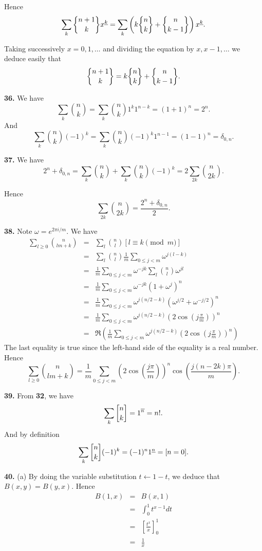 \documentclass[a4paper,12pt]{article}
\newcommand{\newpar}[1]{\bigskip \noindent \textbf{#1.}}
\newcommand{\subpar}[1]{\medskip \noindent (#1)}
\newcommand{\stirlingone}[2]{{#1 \atopwithdelims[]#2}}
\newcommand{\stirlingtwo}[2]{{#1 \atopwithdelims\{\}#2}}
\newcommand{\la}{\leftarrow}
\begin{document}
Hence
\[ \sum_k \stirlingtwo{n+1}{k} x^{\underline{k}} = \sum_k \left(k
\stirlingtwo{n}{k} + \stirlingtwo{n}{k-1}\right) x^{\underline{k}}.\]

Taking successively $x = 0, 1, \ldots$ and dividing the equation by
$x, x-1, \ldots$ we deduce easily that
\[ \stirlingtwo{n+1}{k} = k \stirlingtwo{n}{k} +
\stirlingtwo{n}{k-1}.\]

\newpar{36} We have
\[ \sum_k {n \choose k} = \sum_k {n \choose k} 1^k 1^{n-k} = (1 + 1)^n
= 2^n.\]
And
\[ \sum_k {n \choose k} (-1)^k = \sum_k {n \choose k} (-1)^k 1^{n-1} =
(1-1)^n = \delta_{0,n}.\]

\newpar{37} We have
\[ 2^n + \delta_{0,n} = \sum_k {n \choose k} + \sum_k {n \choose k}
(-1)^k = 2 \sum_{2k} {n \choose 2k}.\]

Hence
\[ \sum_{2k} {n \choose 2k} = \frac{2^n + \delta_{0,n}}{2}.\]

\newpar{38} Note $\omega = e^{2\pi i/m}$.  We have
\begin{eqnarray*}
  \sum_{l\ge 0} {n \choose lm + k} &=& \sum_l {n \choose l} [ l \equiv
    k \pmod m ] \\
  &=& \sum_l {n \choose l} \frac{1}{m} \sum_{0 \le j < m}
  \omega^{j(l-k)} \\
  &=& \frac{1}{m} \sum_{0 \le j < m} \omega^{-jk} \sum_l {n \choose l}
  \omega^{jl} \\
  &=& \frac{1}{m} \sum_{0\le j < m} \omega^{-jk} (1+\omega^j)^n \\
  &=& \frac{1}{m} \sum_{0\le j <m} \omega^{j(n/2 - k)}
  \left(\omega^{j/2} + \omega^{-j/2}\right)^n \\
  &=& \frac{1}{m} \sum_{0\le j <m} \omega^{j(n/2 - k)} \left(2
  \cos\left(j\frac{\pi}{m}\right)\right)^n \\
  &=& \Re\left(\frac{1}{m} \sum_{0\le j <m} \omega^{j(n/2 - k)} \left(2
  \cos\left(j\frac{\pi}{m}\right)\right)^n \right)
\end{eqnarray*}
The last equality is true since the left-hand side of the equality is
a real number.  Hence
\[ \sum_{l\ge 0} {n \choose lm + k} = \frac{1}{m} \sum_{0\le j < m}
\left( 2 \cos\left(\frac{j\pi}{m} \right) \right)^n
\cos\left(\frac{j(n-2k)\pi}{m}\right).\]

\newpar{39} From \textbf{32}, we have
\[ \sum_k \stirlingone{n}{k} = 1^{\overline{n}} = n!.\]
And by definition
\[ \sum_k \stirlingone{n}{k}(-1)^k = (-1)^n 1^{\underline{n}} = [ n = 0].\]

\newpar{40} \subpar{a} By doing the variable substitution $t \la 1-t$,
we deduce that $B(x, y) = B(y, x)$.  Hence
\begin{eqnarray*}
  B(1, x) &=& B(x, 1) \\
  &=& \int_0^1 t^{x-1} dt \\
  &=& \left[ \frac{t^x}{x} \right]_0^1 \\
  &=& \frac{1}{x}
\end{eqnarray*}
\end{document}
